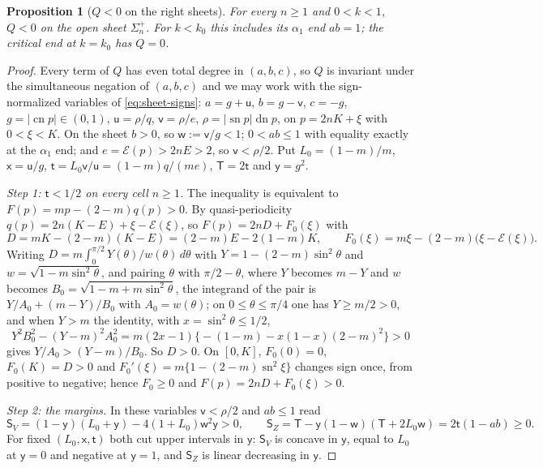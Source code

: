 \documentclass[11pt]{article}
\newtheorem{proposition}[theorem]{Proposition}
\theoremstyle{remark}
\newcommand{\sn}{\operatorname{sn}}
\newcommand{\cn}{\operatorname{cn}}
\newcommand{\dn}{\operatorname{dn}}
\newcommand{\epsi}{\mathcal{E}}
\begin{document}
\begin{proposition}[$Q<0$ on the right sheets]\label{prop:app-right}
For every $n\ge1$ and $0<k<1$, $Q<0$ on the open sheet $\Sigma_n^+$.
For $k<k_0$ this includes its $\alpha_1$ end $ab=1$; the critical end
at $k=k_0$ has $Q=0$.
\end{proposition}
\begin{proof}
Every term of $Q$ has even total degree in $(a,b,c)$, so $Q$ is invariant
under the simultaneous negation of $(a,b,c)$ and we may work with the
sign-normalized variables of \eqref{eq:sheet-signs}: $a=g+\mathsf u$,
$b=g-\mathsf v$, $c=-g$, $g=|\cn p|\in(0,1)$, $\mathsf u=\rho/q$,
$\mathsf v=\rho/e$, $\rho=|\sn p|\dn p$, on $p=2nK+\xi$ with $0<\xi<K$.
On the sheet $b>0$, so $\mathsf w:=\mathsf v/g<1$; $0<ab\le1$ with
equality exactly at the $\alpha_1$ end; and $e=\epsi(p)>2nE>2$, so
$\mathsf v<\rho/2$.  Put $L_0=(1-m)/m$, $\mathsf x=\mathsf u/g$,
$\mathsf t=L_0\mathsf v/\mathsf u=(1-m)q/(me)$, $\mathsf T=2\mathsf t$ and
$\mathsf y=g^2$.

\emph{Step 1: $\mathsf t<1/2$ on every cell $n\ge1$.}  The inequality is
equivalent to $F(p)=mp-(2-m)q(p)>0$.  By quasi-periodicity
$q(p)=2n(K-E)+\xi-\epsi(\xi)$, so $F(p)=2nD+F_0(\xi)$ with
\[
 D=mK-(2-m)(K-E)=(2-m)E-2(1-m)K,\qquad
 F_0(\xi)=m\xi-(2-m)\bigl(\xi-\epsi(\xi)\bigr).
\]
Writing $D=m\int_0^{\pi/2}Y(\theta)/w(\theta)\,d\theta$ with
$Y=1-(2-m)\sin^2\theta$ and $w=\sqrt{1-m\sin^2\theta}$, and pairing
$\theta$ with $\pi/2-\theta$, where $Y$ becomes $m-Y$ and $w$ becomes
$B_0=\sqrt{1-m+m\sin^2\theta}$, the integrand of the pair is
$Y/A_0+(m-Y)/B_0$ with $A_0=w(\theta)$; on $0\le\theta\le\pi/4$ one has
$Y\ge m/2>0$, and when $Y>m$ the identity, with $x=\sin^2\theta\le1/2$,
\[
 Y^2B_0^2-(Y-m)^2A_0^2=m(2x-1)\bigl\{-(1-m)-x(1-x)(2-m)^2\bigr\}>0
\]
gives $Y/A_0>(Y-m)/B_0$.  So $D>0$.  On $[0,K]$, $F_0(0)=0$,
$F_0(K)=D>0$ and $F_0'(\xi)=m\{1-(2-m)\sn^2\xi\}$ changes sign once, from
positive to negative; hence $F_0\ge0$ and $F(p)=2nD+F_0(\xi)>0$.

\emph{Step 2: the margins.}  In these variables $\mathsf v<\rho/2$ and
$ab\le1$ read
\[
 \mathsf S_V=(1-\mathsf y)(L_0+\mathsf y)-4(1+L_0)\mathsf w^2\mathsf y>0,\qquad
 \mathsf S_Z=\mathsf T-\mathsf y(1-\mathsf w)(\mathsf T+2L_0\mathsf w)=2\mathsf t(1-ab)\ge0 .
\]
For fixed $(L_0,\mathsf x,\mathsf t)$ both cut upper intervals in
$\mathsf y$: $\mathsf S_V$ is concave in $\mathsf y$, equal to $L_0$ at
$\mathsf y=0$ and negative at $\mathsf y=1$, and $\mathsf S_Z$ is linear
decreasing in $\mathsf y$.


\end{proof}
\end{document}
